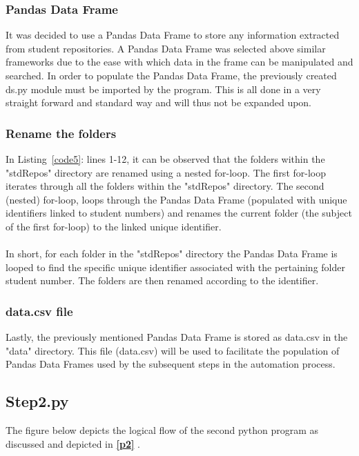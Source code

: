 \subsubsection{Pandas Data Frame}
\label{datFra}
It was decided to use a Pandas Data Frame to store any information extracted from student repositories. A Pandas Data Frame was selected above similar frameworks due to the ease with which data in the frame can be manipulated and searched. In order to populate the Pandas Data Frame, the previously created ds.py module must be imported by the program. This is all done in a very straight forward and standard way and will thus not be expanded upon.  


\subsubsection{Rename the folders}
\label{renFol}


In Listing~\ref{code5}: lines 1-12, it can be observed that the folders within the "stdRepos" directory are renamed using a nested for-loop. The first for-loop iterates through all the folders within the "stdRepos" directory. The second (nested) for-loop, loops through the Pandas Data Frame (populated with unique identifiers linked to student numbers) and renames the current folder (the subject of the first for-loop) to the linked unique identifier.
\\\\
In short, for each folder in the "stdRepos" directory the Pandas Data Frame is looped to find the specific unique identifier associated with the pertaining folder student number. The folders are then renamed according to the identifier. 
\\
\subsubsection{data.csv file}
\label{data.csv}
Lastly, the previously mentioned Pandas Data Frame is stored as data.csv in the "data" directory. This file (data.csv) will be used to facilitate the population of Pandas Data Frames used by the subsequent steps in the automation process. 


\subsection{Step2.py}
\label{step2}

The figure below depicts the logical flow of the second python program as discussed and depicted in \textbf{\ref{p2} }. 


